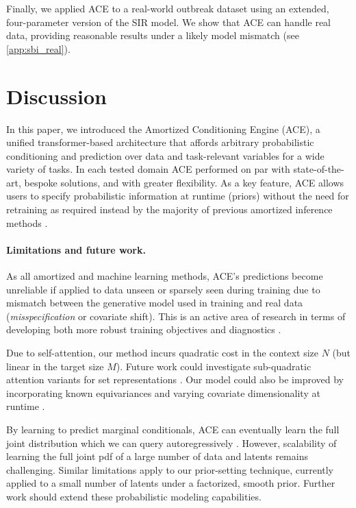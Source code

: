 \documentclass[twoside]{article}
\begin{document}
Finally, we applied ACE to a real-world outbreak dataset \citep{avilov20231978} using an extended, four-parameter version of the SIR model. We show that ACE can handle real data, providing reasonable results under a likely model mismatch (see \cref{app:sbi_real}).

\vspace{-0.25em}
\section{Discussion}
\label{sec:discussion}\label{sec:limitations}

\vspace{-0.25em}
In this paper, we introduced the Amortized Conditioning Engine (ACE), a unified transformer-based architecture that affords arbitrary probabilistic conditioning and prediction over data and task-relevant variables for a wide variety of tasks.
In each tested domain ACE performed on par with state-of-the-art, bespoke solutions, and with greater flexibility. As a key feature, ACE allows users to specify probabilistic information at runtime (priors) without the need for retraining as required instead by the majority of previous amortized inference methods \citep{cranmer2020frontier}.

\vspace{-0.25em}
\paragraph{Limitations and future work.}

As all amortized and machine learning methods, ACE's predictions become unreliable if applied to data unseen or sparsely seen during training due to mismatch between the generative model used in training and real data (\emph{misspecification} or covariate shift). This is an active area of research in terms of developing both more robust training objectives \citep{huang2024learning} and diagnostics \citep{schmitt2023detecting}.

Due to self-attention, our method incurs quadratic cost in the context size $N$ (but linear in the target size $M$). Future work could investigate sub-quadratic attention variants for set representations \citep{feng2023latent}. Our model could also be improved by incorporating known equivariances \citep{huang2023practical} and varying covariate dimensionality at runtime \citep{liu2020task, dutordoir2023neural,muller2023pfns4bo}.

By learning to predict marginal conditionals, ACE can eventually learn the full joint distribution which we can query autoregressively \citep{bruinsma2023autoregressive}. However, scalability of learning the full joint pdf of a large number of data and latents remains challenging.
Similar limitations apply to our prior-setting technique, currently applied to a small number of latents under a factorized, smooth prior. Further work should extend these probabilistic modeling capabilities.
\end{document}
